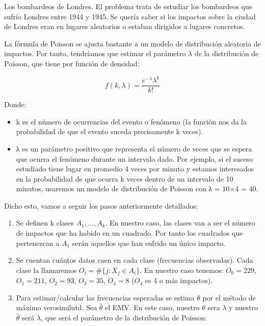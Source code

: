 \documentclass[palatino,nochap]{apuntes}
\begin{document}
\begin{example}
Los bombardeos de Londres. El problema trata de estudiar los bombardeos que sufrío Londres entre 1944 y 1945. Se quería saber si los impactos sobre la ciudad de Londres eran en lugares aleatorios o estaban dirigidos a lugares concretos.

La fórmula de Poisson se ajusta bastante a un modelo de distribución aleatoria de impactos. Por tanto, tendríamos que estimar el parámetro $\lambda$ de la distribución de Poisson, que tiene por función de densidad:

$$ f(k,\lambda)=\frac{e^{-\lambda}\lambda^k}{k!} $$

Donde:
\begin{itemize}
\item k es el número de ocurrencias del evento o fenómeno (la función nos da la probabilidad de que el evento suceda precisamente k veces).

\item λ es un parámetro positivo que representa el número de veces que se espera que ocurra el fenómeno durante un intervalo dado. Por ejemplo, si el suceso estudiado tiene lugar en promedio 4 veces por minuto y estamos interesados en la probabilidad de que ocurra k veces dentro de un intervalo de 10 minutos, usaremos un modelo de distribución de Poisson con λ = 10×4 = 40.
\end{itemize} 
Dicho esto, vamos a seguir los pasos anteriormente detallados:



\begin{enumerate}
\item Se definen k clases $A_1,...,A_k$. En nuestro caso, las clases van a ser el número de impactos que ha habido en un cuadrado. Por tanto los cuadrados que pertenezcan a $A_1$ serán aquellos que han sufrido un único impacto.

\item Se cuentan cuántos datos caen en cada clase (frecuencias observadas). Cada clase la llamaremos $O_i=\#\{j:X_j\in A_i\}$. En nuestro caso tenemos: $O_0=229$, $O_1=211$, $O_2=93$, $O_3=35$, $O_4=8$ ($O_4$ es 4 o más impactos).


\item Para estimar/calcular las frecuencias esperadas se estima $\theta$ por el método de máximo verosimilutd. Sea $\hat{\theta}$ el EMV. En este caso, nuestro $\theta$ sera $\lambda$ y nuestro $\hat{\theta}$ será $\hat{\lambda}$, que será el parámetro de la distribución de Poisson:


\end{enumerate}
\end{example}
\end{document}
